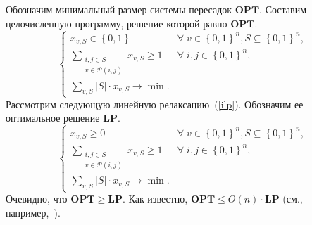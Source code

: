 \documentclass[12pt]{article}
\newcommand{\set}[1]{\left\{#1\right\}}
\newcommand{\abs}[1]{\left|#1\right|}
\newcommand{\zo}{\set{0, 1}}
\newcommand{\Pc}{\mathcal{P}}
\begin{document}
    Обозначим минимальный размер
    системы пересадок $\mathbf{OPT}$.
    Составим целочисленную программу, решение которой равно $\mathbf{OPT}$.
    \begin{equation}
        \label{ilp}
        \begin{cases}
            x_{v,S} \in \zo & \forall \; v \in \zo^n, S \subseteq \zo^n, \\ 
            \sum_{\begin{smallmatrix}i, j \in S \\ v \in \Pc(i, j)\end{smallmatrix}} x_{v,S} \geq 1 & \forall \; i, j \in \zo^n, \\
            \sum_{v,S} |S| \cdot x_{v,S} \to \min.
        \end{cases}
    \end{equation}
    Рассмотрим следующую линейную релаксацию~(\ref{ilp}). Обозначим ее оптимальное решение $\mathbf{LP}$.
    \begin{equation}
        \label{lp}
        \begin{cases}
            x_{v,S} \geq 0 & \forall \; v \in \zo^n, S \subseteq \zo^n, \\ 
            \sum_{\begin{smallmatrix}i, j \in S \\ v \in \Pc(i, j)\end{smallmatrix}} x_{v,S} \geq 1 & \forall \; i, j \in \zo^n, \\
            \sum_{v,S} \abs{S} \cdot x_{v,S} \to \min.
        \end{cases}
    \end{equation}
    Очевидно, что $\mathbf{OPT} \geq \mathbf{LP}$. Как известно, $\mathbf{OPT} \leq O(n) \cdot \mathbf{LP}$
    (см., например,~\cite{V04}).
\end{document}
